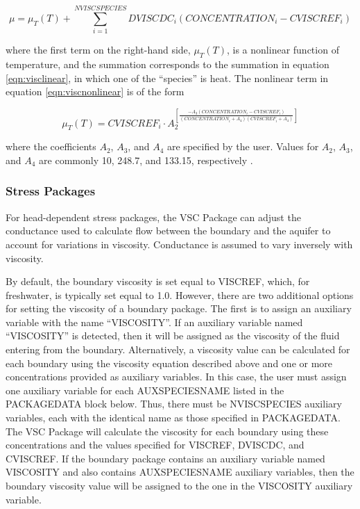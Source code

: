\begin{equation}
\label{eqn:viscnonlinear}
\mu = \mu_T(T) + \sum_{i=1}^{NVISCSPECIES} DVISCDC_i \left ( CONCENTRATION_i - CVISCREF_i \right )
\end{equation}

where the first term on the right-hand side, $\mu_T(T)$, is a nonlinear function of temperature, and the summation corresponds to the summation in equation \ref{eqn:visclinear}, in which one of the ``species'' is heat. The nonlinear term in equation \ref{eqn:viscnonlinear} is of the form

\begin{equation}
\label{eqn:munonlinear}
\mu_T(T) = CVISCREF_i \cdot A_2^{\left [ \frac {-A_3 \left ( CONCENTRATION_i - CVISCREF_i \right ) } {\left ( CONCENTRATION_i + A_4 \right ) \left ( CVISCREF_i + A_4 \right )} \right ]}
\end{equation}

\noindent where the coefficients $A_2$, $A_3$, and $A_4$ are specified by the user.  Values for $A_2$, $A_3$, and $A_4$ are commonly 10, 248.7, and 133.15, respectively  \citep{langevin2008seawat, Voss1984sutra}.
 
\subsubsection{Stress Packages}

For head-dependent stress packages, the VSC Package can adjust the conductance used to calculate flow between the boundary and the aquifer to account for variations in viscosity. Conductance is assumed to vary inversely with viscosity.

By default, the boundary viscosity is set equal to VISCREF, which, for freshwater, is typically set equal to 1.0. However, there are two additional options for setting the viscosity of a boundary package.  The first is to assign an auxiliary variable with the name ``VISCOSITY''.  If an auxiliary variable named ``VISCOSITY'' is detected, then it will be assigned as the viscosity of the fluid entering from the boundary.  Alternatively, a viscosity value can be calculated for each boundary using the viscosity equation described above and one or more concentrations provided as auxiliary variables.  In this case, the user must assign one auxiliary variable for each AUXSPECIESNAME listed in the PACKAGEDATA block below.  Thus, there must be NVISCSPECIES auxiliary variables, each with the identical name as those specified in PACKAGEDATA.  The VSC Package will calculate the viscosity for each boundary using these concentrations and the values specified for VISCREF, DVISCDC, and CVISCREF.  If the boundary package contains an auxiliary variable named VISCOSITY and also contains AUXSPECIESNAME auxiliary variables, then the boundary viscosity value will be assigned to the one in the VISCOSITY auxiliary variable.

